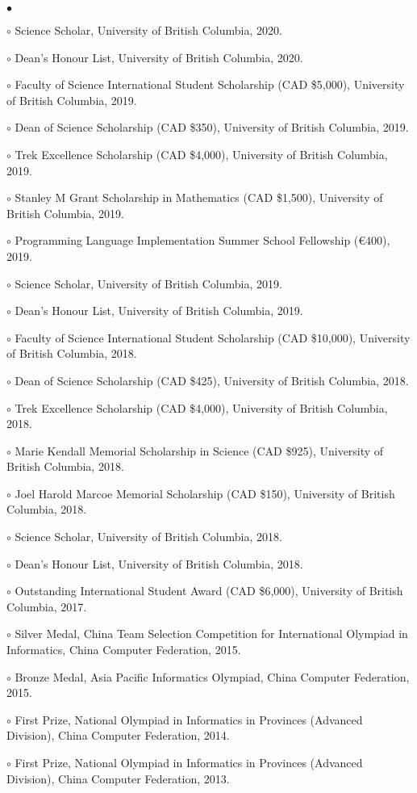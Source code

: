 \documentclass[margin,line]{res}
\newenvironment{list2}{
  \begin{list}{$\bullet$}{%
      \setlength{\itemsep}{0in}
      \setlength{\parsep}{0in} \setlength{\parskip}{0in}
      \setlength{\topsep}{0in} \setlength{\partopsep}{0in}
      \setlength{\leftmargin}{0.2in}}}{\end{list}}
\begin{document}
\begin{resume}
\begin{list2}
\item[$\circ$] Science Scholar, University of British Columbia, 2020.
\item[$\circ$] Dean's Honour List, University of British Columbia, 2020.
\item[$\circ$] Faculty of Science International Student Scholarship (CAD \$5,000), University of British Columbia, 2019.
\item[$\circ$] Dean of Science Scholarship (CAD \$350), University of British Columbia, 2019.
\item[$\circ$] Trek Excellence Scholarship (CAD \$4,000), University of British Columbia, 2019.
\item[$\circ$] Stanley M Grant Scholarship in Mathematics (CAD \$1,500), University of British Columbia, 2019.
\item[$\circ$] Programming Language Implementation Summer School Fellowship (€400), 2019.
\item[$\circ$] Science Scholar, University of British Columbia, 2019.
\item[$\circ$] Dean's Honour List, University of British Columbia, 2019.
\item[$\circ$] Faculty of Science International Student Scholarship (CAD \$10,000), University of British Columbia, 2018.
\item[$\circ$] Dean of Science Scholarship (CAD \$425), University of British Columbia, 2018.
\item[$\circ$] Trek Excellence Scholarship (CAD \$4,000), University of British Columbia, 2018.
\item[$\circ$] Marie Kendall Memorial Scholarship in Science (CAD \$925), University of British Columbia, 2018.
\item[$\circ$] Joel Harold Marcoe Memorial Scholarship (CAD \$150), University of British Columbia, 2018.
\item[$\circ$] Science Scholar, University of British Columbia, 2018.
\item[$\circ$] Dean's Honour List, University of British Columbia, 2018.
\item[$\circ$] Outstanding International Student Award (CAD \$6,000), University of British Columbia, 2017.
\item[$\circ$] Silver Medal, China Team Selection Competition for International Olympiad in Informatics, China Computer Federation, 2015.
\item[$\circ$] Bronze Medal, Asia Pacific Informatics Olympiad, China Computer Federation, 2015.
\item[$\circ$] First Prize, National Olympiad in Informatics in Provinces (Advanced Division), China Computer Federation, 2014.
\item[$\circ$] First Prize, National Olympiad in Informatics in Provinces (Advanced Division), China Computer Federation, 2013.
\end{list2}



\end{resume}
\end{document}
